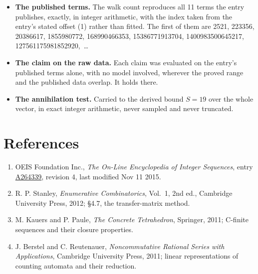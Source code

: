 \documentclass[11pt]{article}
\theoremstyle{definition}
\begin{document}
\begin{itemize}

\item {\bfseries The published terms.} The walk count reproduces all 11 terms the entry publishes, exactly, in integer arithmetic, with the index taken from the entry's stated offset (1) rather than fitted. The first of them are 2521, 223356, 20386617, 1855980772, 168990466353, 15386771913704, 1400983500645217, 127561175981852920,~\dots

\item {\bfseries The claim on the raw data.} Each claim was evaluated on the entry's published terms alone, with no model involved, wherever the proved range and the published data overlap. It holds there.

\item {\bfseries The annihilation test.} Carried to the derived bound $S = 19$ over the whole vector, in exact integer arithmetic, never sampled and never truncated.

\end{itemize}

\section{References}

\begin{enumerate}

\item OEIS Foundation Inc., \emph{The On-Line Encyclopedia of Integer Sequences}, entry \href{https://oeis.org/A264339}{A264339}, revision 4, last modified Nov 11 2015.

\item R. P. Stanley, \emph{Enumerative Combinatorics}, Vol.~1, 2nd ed., Cambridge University Press, 2012; \S4.7, the transfer-matrix method.

\item M. Kauers and P. Paule, \emph{The Concrete Tetrahedron}, Springer, 2011; C-finite sequences and their closure properties.

\item J. Berstel and C. Reutenauer, \emph{Noncommutative Rational Series with Applications}, Cambridge University Press, 2011; linear representations of counting automata and their reduction.

\end{enumerate}
\end{document}
